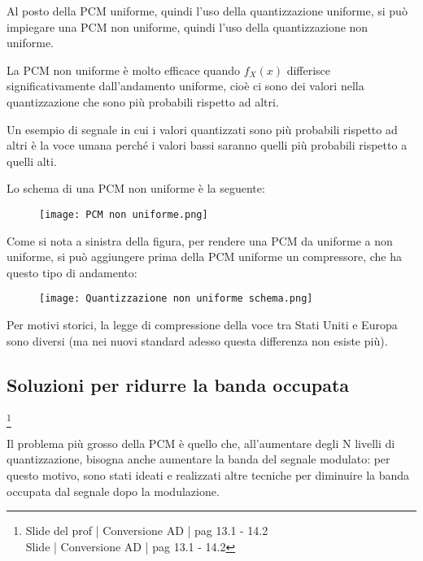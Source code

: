 Al posto della PCM uniforme, quindi l'uso della quantizzazione uniforme, 
si può impiegare una PCM non uniforme, quindi l'uso della quantizzazione non uniforme. \newline 

La PCM non uniforme è molto efficace quando $f_X (x)$ differisce significativamente dall'andamento uniforme, 
cioè ci sono dei valori nella quantizzazione che sono più probabili rispetto ad altri. \newline 

Un esempio di segnale in cui i valori quantizzati sono più probabili rispetto ad altri è la voce umana 
perché i valori bassi saranno quelli più probabili rispetto a quelli alti. \newline 

Lo schema di una PCM non uniforme è la seguente: 

\begin{figure}[h]
    \centering
    \texttt{[image: PCM non uniforme.png]}
\end{figure} 

Come si nota a sinistra della figura, per rendere una PCM da uniforme a non uniforme, 
si può aggiungere prima della PCM uniforme un compressore, che ha questo tipo di andamento: 

\begin{figure}[h]
    \centering
    \texttt{[image: Quantizzazione non uniforme schema.png]}
\end{figure} 

Per motivi storici, la legge di compressione della voce tra Stati Uniti e Europa sono diversi (ma nei nuovi standard adesso questa differenza non esiste più). \newline 

\newpage 

\subsection{Soluzioni per ridurre la banda occupata}
\footnote{Slide del prof | Conversione AD | pag 13.1 - 14.2\\  
Slide | Conversione AD | pag 13.1 - 14.2
}

Il problema più grosso della PCM è quello che, all'aumentare degli N livelli di quantizzazione, 
bisogna anche aumentare la banda del segnale modulato: 
per questo motivo, sono stati ideati e realizzati altre tecniche per diminuire la banda occupata dal segnale dopo la modulazione. \newline 

